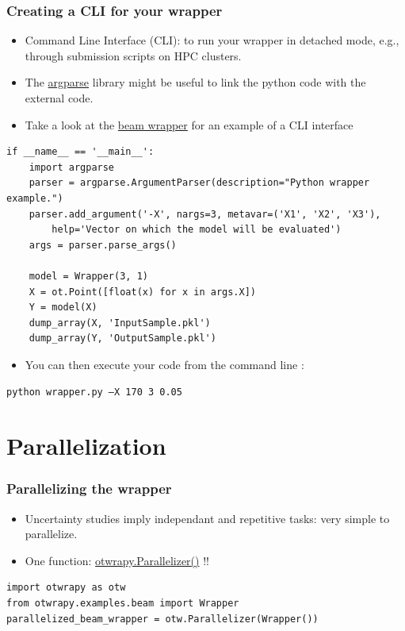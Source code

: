 \documentclass[10pt, aspectratio=169]{beamer}
\begin{document}
\begin{frame}[fragile]
\frametitle{Creating a CLI for your wrapper}
\begin{itemize}
\item Command Line Interface (CLI): to run your wrapper in detached mode, e.g., through submission scripts on HPC clusters.
\item The \href{https://docs.python.org/3/library/argparse.html}{argparse} library might be useful to link the python code with the external code.
\item Take a look at the \href{https://github.com/openturns/otwrapy/tree/master/otwrapy/examples/beam}{beam wrapper}  for an example of a CLI interface
\end{itemize}
\begin{Verbatim}[xleftmargin=10mm]
if __name__ == '__main__':
    import argparse
    parser = argparse.ArgumentParser(description="Python wrapper example.")
    parser.add_argument('-X', nargs=3, metavar=('X1', 'X2', 'X3'),
        help='Vector on which the model will be evaluated')
    args = parser.parse_args()

    model = Wrapper(3, 1)
    X = ot.Point([float(x) for x in args.X])
    Y = model(X)
    dump_array(X, 'InputSample.pkl')
    dump_array(Y, 'OutputSample.pkl')
\end{Verbatim}
\begin{itemize}
\item You can then execute your code from the command line :
\end{itemize}
\begin{Verbatim}[xleftmargin=10mm]
python wrapper.py –X 170 3 0.05
\end{Verbatim}
\end{frame}

\section{Parallelization}
\label{sec-7}
\begin{frame}[fragile]
\frametitle{Parallelizing the wrapper}
\begin{itemize}
\item Uncertainty studies imply independant and repetitive tasks: very simple to parallelize.
\item One function: \href{http://openturns.github.io/otwrapy/master/_generated/otwrapy.Parallelizer.html}{otwrapy.Parallelizer()} !!
\end{itemize}
\begin{Verbatim}[xleftmargin=10mm]
import otwrapy as otw
from otwrapy.examples.beam import Wrapper
parallelized_beam_wrapper = otw.Parallelizer(Wrapper())
\end{Verbatim}
\end{frame}
\end{document}
